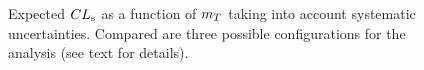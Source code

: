 \begin{figure}[htb]\begin{center}
	\caption{Expected $CL_{\rm s}$ as a function of $m_{\T}$ taking into account systematic uncertainties.
Compared are three possible configurations for the analysis (see text for details).\label{fig:cls_study}}
\end{center}\end{figure}



